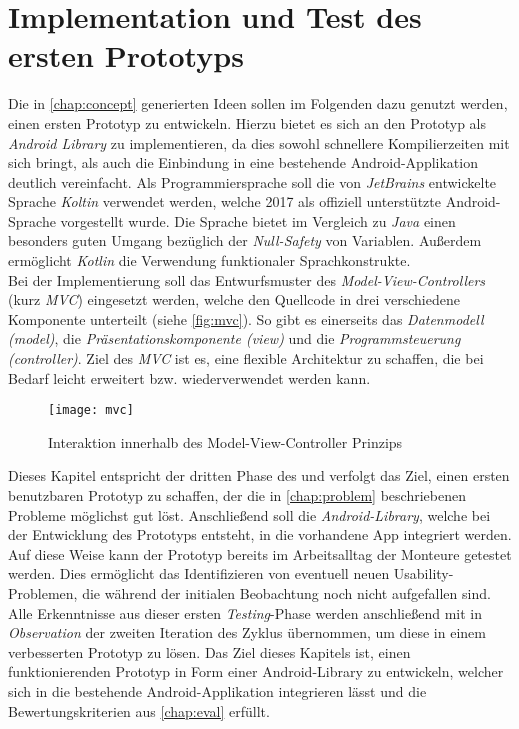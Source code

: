 \chapter{Implementation und Test des ersten Prototyps}

Die in \autoref{chap:concept} generierten Ideen sollen im Folgenden dazu genutzt werden, einen ersten Prototyp zu entwickeln.
Hierzu bietet es sich an den Prototyp als \emph{Android Library} zu implementieren, da dies sowohl schnellere Kompilierzeiten mit sich bringt, als auch die Einbindung in eine bestehende Android-Applikation deutlich vereinfacht.
Als Programmiersprache soll die von \emph{JetBrains} entwickelte Sprache \emph{Koltin} verwendet werden, welche 2017 als offiziell unterstützte Android-Sprache vorgestellt wurde.
Die Sprache bietet im Vergleich zu \emph{Java} einen besonders guten Umgang bezüglich der \emph{Null-Safety} von Variablen.
Außerdem ermöglicht \emph{Kotlin} die Verwendung funktionaler Sprachkonstrukte. \\

Bei der Implementierung soll das Entwurfsmuster des \emph{Model-View-Controllers} (kurz \emph{MVC}) eingesetzt werden, welche den Quellcode in drei verschiedene Komponente unterteilt (siehe \autoref{fig:mvc}). 
So gibt es einerseits das \emph{Datenmodell (model)}, die \emph{Präsentationskomponente (view)} und die \emph{Programmsteuerung (controller)}.
Ziel des \emph{MVC} ist es, eine flexible Architektur zu schaffen, die bei Bedarf leicht erweitert bzw. wiederverwendet werden kann. \\

\begin{figure}[h]
	\centering
	\texttt{[image: mvc]}
	\caption{Interaktion innerhalb des Model-View-Controller Prinzips}
	\label{fig:mvc}
\end{figure}

Dieses Kapitel entspricht der dritten Phase des \hcdp{} und verfolgt das Ziel, einen ersten benutzbaren Prototyp zu schaffen, der die in \autoref{chap:problem} beschriebenen Probleme möglichst gut löst. 
Anschließend soll die \emph{Android-Library}, welche bei der Entwicklung des Prototyps entsteht, in die vorhandene App integriert werden.
Auf diese Weise kann der Prototyp bereits im Arbeitsalltag der Monteure getestet werden.
Dies ermöglicht das Identifizieren von eventuell neuen Usability-Problemen, die während der initialen Beobachtung noch nicht aufgefallen sind. \\

Alle Erkenntnisse aus dieser ersten \emph{Testing}-Phase werden anschließend mit in \emph{Observation} der zweiten Iteration des \hcdp{} Zyklus übernommen, um diese in einem verbesserten Prototyp zu lösen.
Das Ziel dieses Kapitels ist, einen funktionierenden Prototyp in Form einer Android-Library zu entwickeln, welcher sich in die bestehende Android-Applikation integrieren lässt und die Bewertungskriterien aus \autoref{chap:eval} erfüllt.






